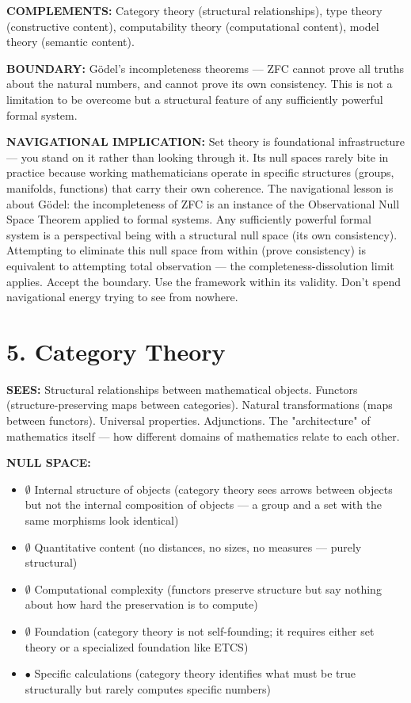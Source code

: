 \textbf{COMPLEMENTS:} Category theory (structural relationships), type theory (constructive content), computability theory (computational content), model theory (semantic content).


\textbf{BOUNDARY:} Gödel's incompleteness theorems — ZFC cannot prove all truths about the natural numbers, and cannot prove its own consistency. This is not a limitation to be overcome but a structural feature of any sufficiently powerful formal system.


\textbf{NAVIGATIONAL IMPLICATION:} Set theory is foundational infrastructure — you stand on it rather than looking through it. Its null spaces rarely bite in practice because working mathematicians operate in specific structures (groups, manifolds, functions) that carry their own coherence. The navigational lesson is about Gödel: the incompleteness of ZFC is an instance of the Observational Null Space Theorem applied to formal systems. Any sufficiently powerful formal system is a perspectival being with a structural null space (its own consistency). Attempting to eliminate this null space from within (prove consistency) is equivalent to attempting total observation — the completeness-dissolution limit applies. Accept the boundary. Use the framework within its validity. Don't spend navigational energy trying to see from nowhere.


\bigskip\noindent\makebox[\textwidth]{\color{rulegray}\rule{5cm}{0.3pt}}\bigskip


\section*{5. Category Theory}


\textbf{SEES:} Structural relationships between mathematical objects. Functors (structure-preserving maps between categories). Natural transformations (maps between functors). Universal properties. Adjunctions. The "architecture" of mathematics itself — how different domains of mathematics relate to each other.


\textbf{NULL SPACE:}

\begin{itemize}[nosep,leftmargin=*]
  \item $\emptyset$ Internal structure of objects (category theory sees arrows between objects but not the internal composition of objects — a group and a set with the same morphisms look identical)
  \item $\emptyset$ Quantitative content (no distances, no sizes, no measures — purely structural)
  \item $\emptyset$ Computational complexity (functors preserve structure but say nothing about how hard the preservation is to compute)
  \item $\emptyset$ Foundation (category theory is not self-founding; it requires either set theory or a specialized foundation like ETCS)
  \item $\bullet$ Specific calculations (category theory identifies what must be true structurally but rarely computes specific numbers)
\end{itemize}


